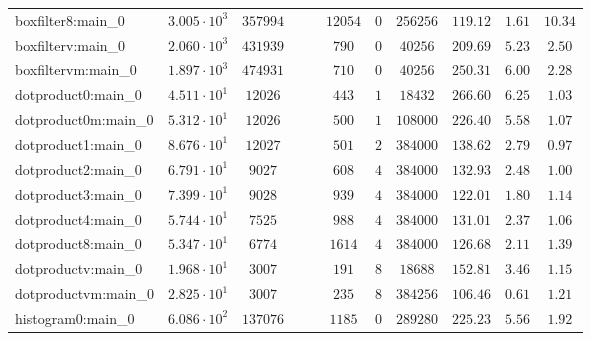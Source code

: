 \begin{tabular}{|l|c|c|c|c|c|c|c|c|c|c|}
boxfilter8:main\_0             & $ 3.005 \cdot 10^{3} $ & $ 357994   $ & $  $ & $    $ & $ 12054  $ & $ 0    $ & $ 256256   $ & $ 119.12      $ & $ 1.61    $ & $ 10.34   $ \\
boxfilterv:main\_0             & $ 2.060 \cdot 10^{3} $ & $ 431939   $ & $  $ & $    $ & $ 790    $ & $ 0    $ & $ 40256    $ & $ 209.69      $ & $ 5.23    $ & $ 2.50    $ \\
boxfiltervm:main\_0            & $ 1.897 \cdot 10^{3} $ & $ 474931   $ & $  $ & $    $ & $ 710    $ & $ 0    $ & $ 40256    $ & $ 250.31      $ & $ 6.00    $ & $ 2.28    $ \\
dotproduct0:main\_0            & $ 4.511 \cdot 10^{1} $ & $ 12026    $ & $  $ & $    $ & $ 443    $ & $ 1    $ & $ 18432    $ & $ 266.60      $ & $ 6.25    $ & $ 1.03    $ \\
dotproduct0m:main\_0           & $ 5.312 \cdot 10^{1} $ & $ 12026    $ & $  $ & $    $ & $ 500    $ & $ 1    $ & $ 108000   $ & $ 226.40      $ & $ 5.58    $ & $ 1.07    $ \\
dotproduct1:main\_0            & $ 8.676 \cdot 10^{1} $ & $ 12027    $ & $  $ & $    $ & $ 501    $ & $ 2    $ & $ 384000   $ & $ 138.62      $ & $ 2.79    $ & $ 0.97    $ \\
dotproduct2:main\_0            & $ 6.791 \cdot 10^{1} $ & $ 9027     $ & $  $ & $    $ & $ 608    $ & $ 4    $ & $ 384000   $ & $ 132.93      $ & $ 2.48    $ & $ 1.00    $ \\
dotproduct3:main\_0            & $ 7.399 \cdot 10^{1} $ & $ 9028     $ & $  $ & $    $ & $ 939    $ & $ 4    $ & $ 384000   $ & $ 122.01      $ & $ 1.80    $ & $ 1.14    $ \\
dotproduct4:main\_0            & $ 5.744 \cdot 10^{1} $ & $ 7525     $ & $  $ & $    $ & $ 988    $ & $ 4    $ & $ 384000   $ & $ 131.01      $ & $ 2.37    $ & $ 1.06    $ \\
dotproduct8:main\_0            & $ 5.347 \cdot 10^{1} $ & $ 6774     $ & $  $ & $    $ & $ 1614   $ & $ 4    $ & $ 384000   $ & $ 126.68      $ & $ 2.11    $ & $ 1.39    $ \\
dotproductv:main\_0            & $ 1.968 \cdot 10^{1} $ & $ 3007     $ & $  $ & $    $ & $ 191    $ & $ 8    $ & $ 18688    $ & $ 152.81      $ & $ 3.46    $ & $ 1.15    $ \\
dotproductvm:main\_0           & $ 2.825 \cdot 10^{1} $ & $ 3007     $ & $  $ & $    $ & $ 235    $ & $ 8    $ & $ 384256   $ & $ 106.46      $ & $ 0.61    $ & $ 1.21    $ \\
histogram0:main\_0             & $ 6.086 \cdot 10^{2} $ & $ 137076   $ & $  $ & $    $ & $ 1185   $ & $ 0    $ & $ 289280   $ & $ 225.23      $ & $ 5.56    $ & $ 1.92    $ \\

\end{tabular}
